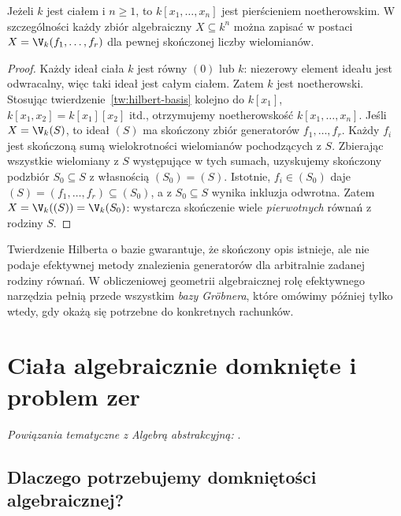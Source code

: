 \begin{wniosek}
\label{wn:noetherian-polys}
Jeżeli $k$ jest ciałem i $n\ge1$, to $k[x_1,\dots,x_n]$
jest pierścieniem noetherowskim. W szczególności każdy zbiór
algebraiczny $X\subseteq k^n$ można zapisać w postaci
$X=\V_k(f_1,\dots,f_r)$ dla pewnej skończonej liczby wielomianów.
\end{wniosek}
\begin{proof}
Każdy ideał ciała $k$ jest równy $(0)$ lub $k$:
niezerowy element ideału jest odwracalny, więc taki ideał jest całym
ciałem. Zatem $k$ jest noetherowski.
Stosując twierdzenie~\ref{tw:hilbert-basis} kolejno do
$k[x_1]$, $k[x_1,x_2]=k[x_1][x_2]$ itd., otrzymujemy
noetherowskość $k[x_1,\dots,x_n]$.
Jeśli $X=\V_k(S)$, to ideał $(S)$ ma skończony zbiór
generatorów $f_1,\dots,f_r$. Każdy $f_i$ jest skończoną
sumą wielokrotności wielomianów pochodzących z $S$.
Zbierając wszystkie wielomiany z $S$ występujące w tych
sumach, uzyskujemy skończony podzbiór $S_0\subseteq S$
z własnością $(S_0)=(S)$. Istotnie, $f_i\in(S_0)$ daje
$(S)=(f_1,\dots,f_r)\subseteq(S_0)$, a z $S_0\subseteq S$
wynika inkluzja odwrotna. Zatem
$X=\V_k((S))=\V_k(S_0)$: wystarcza skończenie wiele
\emph{pierwotnych} równań z rodziny $S$.
\end{proof}

\begin{uwaga}
Twierdzenie Hilberta o bazie gwarantuje, że skończony opis istnieje,
ale nie podaje efektywnej metody znalezienia generatorów dla
arbitralnie zadanej rodziny równań. W obliczeniowej geometrii
algebraicznej rolę efektywnego narzędzia pełnią przede wszystkim
\emph{bazy Gröbnera}, które omówimy później tylko wtedy,
gdy okażą się potrzebne do konkretnych rachunków.
\end{uwaga}

\section{Ciała algebraicznie domknięte i problem zer}

\noindent\emph{Powiązania tematyczne z Algebrą abstrakcyjną:} .


\subsection{Dlaczego potrzebujemy domkniętości algebraicznej?}

